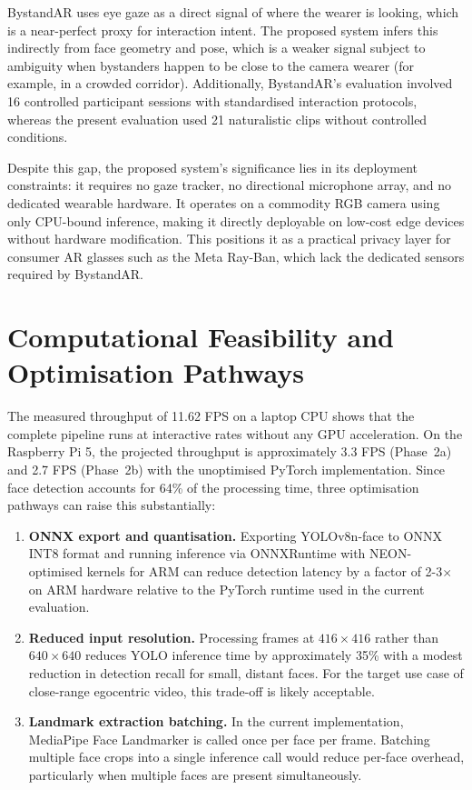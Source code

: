 BystandAR uses eye gaze as a direct signal of where the wearer is looking, which is
a near-perfect proxy for interaction intent. The proposed system infers this
indirectly from face geometry and pose, which is a weaker signal subject to ambiguity
when bystanders happen to be close to the camera wearer (for example, in a crowded
corridor). Additionally, BystandAR's evaluation involved 16 controlled participant
sessions with standardised interaction protocols, whereas the present evaluation used
21 naturalistic clips without controlled conditions.

Despite this gap, the proposed system's significance lies in its deployment
constraints: it requires no gaze tracker, no directional microphone array, and no
dedicated wearable hardware. It operates on a commodity RGB camera using only
CPU-bound inference, making it directly deployable on low-cost edge devices without
hardware modification. This positions it as a practical privacy layer for consumer
AR glasses such as the Meta Ray-Ban, which lack the dedicated sensors required by
BystandAR.

\section{Computational Feasibility and Optimisation Pathways}
\label{sec:disc_fps}

The measured throughput of 11.62 FPS on a laptop CPU shows that the complete
pipeline runs at interactive rates without any GPU acceleration. On the Raspberry Pi 5,
the projected throughput is approximately 3.3 FPS (Phase~2a) and 2.7 FPS (Phase~2b)
with the unoptimised PyTorch implementation. Since face detection accounts for 64\% of
the processing time, three optimisation pathways can raise this substantially:

\begin{enumerate}
  \item \textbf{ONNX export and quantisation.} Exporting YOLOv8n-face to ONNX INT8
        format and running inference via ONNXRuntime with NEON-optimised kernels for
        ARM can reduce detection latency by a factor of 2-3$\times$ on ARM hardware
        relative to the PyTorch runtime used in the current evaluation.

  \item \textbf{Reduced input resolution.} Processing frames at $416 \times 416$
        rather than $640 \times 640$ reduces YOLO inference time by approximately
        35\% with a modest reduction in detection recall for small, distant faces.
        For the target use case of close-range egocentric video, this trade-off is
        likely acceptable.

  \item \textbf{Landmark extraction batching.} In the current implementation,
        MediaPipe Face Landmarker is called once per face per frame. Batching
        multiple face crops into a single inference call would reduce per-face
        overhead, particularly when multiple faces are present simultaneously.
\end{enumerate}

